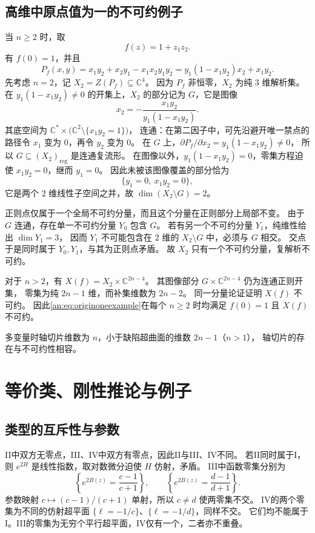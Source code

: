 \documentclass[11pt,a4paper,oneside,openany]{book}
\theoremstyle{lecture}
\newcommand{\C}{\mathbb C}
\numberwithin{equation}{section}
\begin{document}
\subsection{高维中原点值为一的不可约例子}
当 $n\geq2$ 时，取
\begin{equation}\label{an:eq:originoneexample}
 f(z)=1+z_1z_2.
\end{equation}
有 $f(0)=1$，并且
\[
 P_f(x,y)=x_1y_2+x_2y_1-x_1x_2y_1y_2
         =y_1(1-x_1y_2)x_2+x_1y_2.
\]
先考虑 $n=2$，记 $X_2=Z(P_f)\subseteq\C^4$。
因为 $P_f$ 非恒零，$X_2$ 为纯 $3$ 维解析集。
在 $y_1(1-x_1y_2)\ne0$ 的开集上，$X_2$ 的部分记为 $G$，它是图像
\[
 x_2=-\frac{x_1y_2}{y_1(1-x_1y_2)}.
\]
其底空间为 $\C^*\times\bigl(\C^2\setminus\{x_1y_2=1\}\bigr)$，
连通：在第二因子中，可先沿避开唯一禁点的路径令 $x_1$ 变为
$0$，再令 $y_2$ 变为 $0$。
在 $G$ 上，$\partial P_f/\partial x_2=y_1(1-x_1y_2)\ne0$，
所以 $G\subseteq(X_2)_{\mathrm{reg}}$ 是连通复流形。
在图像以外，$y_1(1-x_1y_2)=0$，零集方程迫使 $x_1y_2=0$，继而 $y_1=0$。
因此未被该图像覆盖的部分恰为
\[
 \{y_1=0,\ x_1y_2=0\},
\]
它是两个 $2$ 维线性子空间之并，故 $\dim(X_2\setminus G)=2$。

正则点仅属于一个全局不可约分量，而且这个分量在正则部分上局部不变。
由于 $G$ 连通，存在单一不可约分量 $Y_0$ 包含 $G$。
若有另一个不可约分量 $Y_1$，纯维性给出 $\dim Y_1=3$，
因而 $Y_1$ 不可能包含在 $2$ 维的 $X_2\setminus G$ 中，必须与 $G$ 相交。
交点于是同时属于 $Y_0,Y_1$，与其为正则点矛盾。
故 $X_2$ 只有一个不可约分量，复解析不可约。

对于 $n>2$，有 $X(f)=X_2\times\C^{2n-4}$。
其图像部分 $G\times\C^{2n-4}$ 仍为连通正则开集，
零集为纯 $2n-1$ 维，而补集维数为 $2n-2$。
同一分量论证证明 $X(f)$ 不可约。
因此\eqref{an:eq:originoneexample}在每个 $n\ge2$ 时均满足 $f(0)=1$ 且 $X(f)$ 不可约。

多变量时轴切片维数为 $n$，小于缺陷超曲面的维数 $2n-1$（$n>1$），
轴切片的存在与不可约性相容。

\section{等价类、刚性推论与例子}\label{an:sec:consequences}
\subsection{类型的互斥性与参数}\label{an:sec:parameters}
II中双方无零点，III、IV中双方有零点，因此II与III、IV不同。
若II同时属于I，则 $e^{2H}$ 是线性指数，取对数微分迫使 $H$ 仿射，矛盾。
III中函数零集分别为
\[
 \left\{e^{2B(z)}=\frac{c-1}{c+1}\right\},\qquad
 \left\{e^{2B(z)}=\frac{d-1}{d+1}\right\}.
\]
参数映射 $c\mapsto(c-1)/(c+1)$ 单射，所以 $c\ne d$ 使两零集不交。
IV的两个零集为不同的仿射超平面 $\{\ell=-1/c\}$、$\{\ell=-1/d\}$，同样不交。
它们均不能属于I。III的零集为无穷个平行超平面，IV仅有一个，二者亦不重叠。
\end{document}
